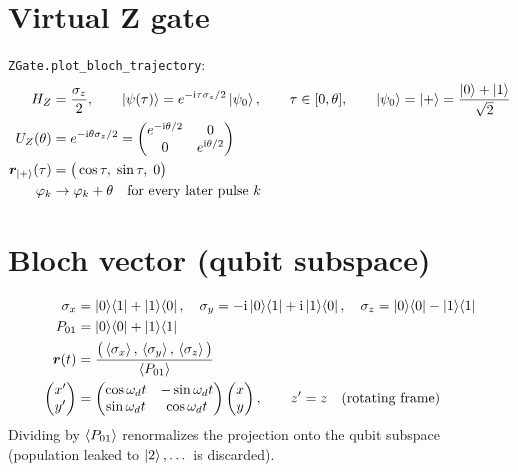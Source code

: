 \documentclass[11pt]{article}
\newcommand{\ii}{\mathrm{i}}
\begin{document}
\section*{Virtual Z gate}
\texttt{ZGate.plot\_bloch\_trajectory}:
\begin{align}
  H_Z &= \frac{\sigma_z}{2}, \qquad \ket{\psi(\tau)} = e^{-\ii\tau\sigma_z/2}\ket{\psi_0},
  \qquad \tau \in [0, \theta], \qquad \ket{\psi_0} = \ket{+} = \frac{\ket{0} + \ket{1}}{\sqrt{2}} \\
  U_Z(\theta) &= e^{-\ii\theta\sigma_z/2}
     = \begin{pmatrix} e^{-\ii\theta/2} & 0 \\ 0 & e^{\ii\theta/2} \end{pmatrix} \\
  \bm{r}_{\ket{+}}(\tau) &= \big(\cos\tau,\; \sin\tau,\; 0\big) \\
  \varphi_k &\to \varphi_k + \theta \quad \text{for every later pulse } k
\end{align}

\section*{Bloch vector (qubit subspace)}
\begin{align}
  \sigma_x &= \ket{0}\!\bra{1} + \ket{1}\!\bra{0}, \quad
  \sigma_y = -\ii\ket{0}\!\bra{1} + \ii\ket{1}\!\bra{0}, \quad
  \sigma_z = \ket{0}\!\bra{0} - \ket{1}\!\bra{1} \\
  P_{01} &= \ket{0}\!\bra{0} + \ket{1}\!\bra{1} \\
  \bm{r}(t) &= \frac{\big(\braket{\sigma_x},\, \braket{\sigma_y},\, \braket{\sigma_z}\big)}{\braket{P_{01}}} \\
  \begin{pmatrix} x' \\ y' \end{pmatrix}
    &= \begin{pmatrix} \cos\omega_d t & -\sin\omega_d t \\ \sin\omega_d t & \cos\omega_d t \end{pmatrix}
       \begin{pmatrix} x \\ y \end{pmatrix}, \qquad z' = z
       \quad \text{(rotating frame)}
\end{align}
Dividing by $\braket{P_{01}}$ renormalizes the projection onto the qubit subspace (population
leaked to $\ket{2},\dots$ is discarded).
\end{document}
